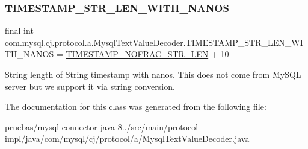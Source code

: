 \subsubsection{\texorpdfstring{T\+I\+M\+E\+S\+T\+A\+M\+P\+\_\+\+S\+T\+R\+\_\+\+L\+E\+N\+\_\+\+W\+I\+T\+H\+\_\+\+N\+A\+N\+OS}{TIMESTAMP\_STR\_LEN\_WITH\_NANOS}}
{\footnotesize\ttfamily final int com.\+mysql.\+cj.\+protocol.\+a.\+Mysql\+Text\+Value\+Decoder.\+T\+I\+M\+E\+S\+T\+A\+M\+P\+\_\+\+S\+T\+R\+\_\+\+L\+E\+N\+\_\+\+W\+I\+T\+H\+\_\+\+N\+A\+N\+OS = \mbox{\hyperlink{classcom_1_1mysql_1_1cj_1_1protocol_1_1a_1_1_mysql_text_value_decoder_a8231f45af061c93c4b82283c5f00d0dc}{T\+I\+M\+E\+S\+T\+A\+M\+P\+\_\+\+N\+O\+F\+R\+A\+C\+\_\+\+S\+T\+R\+\_\+\+L\+EN}} + 10\hspace{0.3cm}{\ttfamily [static]}}

String length of String timestamp with nanos. This does not come from My\+S\+QL server but we support it via string conversion. 

The documentation for this class was generated from the following file\+:\begin{DoxyCompactItemize}
\item 
pruebas/mysql-\/connector-\/java-\/8../src/main/protocol-\/impl/java/com/mysql/cj/protocol/a/Mysql\+Text\+Value\+Decoder.\+java\end{DoxyCompactItemize}
